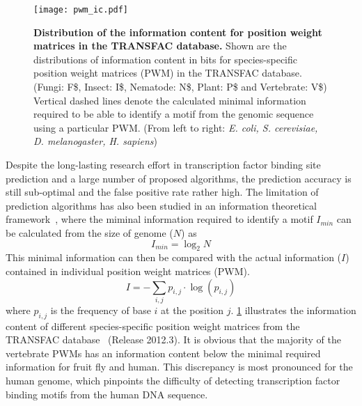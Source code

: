 \begin{figure}[!ht]
\begin{center}
\texttt{[image: pwm\_ic.pdf]}
\end{center}
\caption[Information content of position weight matrices]{
{\bf Distribution of the information content for position weight matrices in 
the TRANSFAC database.}
Shown are the distributions of information content in bits for species-specific
position weight matrices (PWM) in the TRANSFAC database. (Fungi: F\$, Insect: I\$,
Nematode: N\$, Plant: P\$ and Vertebrate: V\$) Vertical dashed lines denote
the calculated minimal information required to be able to identify a motif from
the genomic sequence using a particular PWM. (From left to right: \emph{E. coli, 
S. cerevisiae, D. melanogaster, H. sapiens})
}
\label{fig:pwm_ic}
\end{figure}

Despite the long-lasting research effort in transcription factor binding site
prediction and a large number of proposed algorithms, the prediction accuracy 
is still sub-optimal and the false positive rate rather high. The limitation of
prediction algorithms has also been studied in an information theoretical
framework~\citep{Wunderlich2009}, where the miminal information required to identify a motif $I_{min}$ can be calculated from the size of genome ($N$) as
\begin{equation}
I_{min}=\log_2 N
\end{equation}
This minimal information can then be compared with the actual information ($I$) 
contained in individual position weight matrices (PWM).
\begin{equation}
\displaystyle I = -\sum_{i,j}p_{i,j} \cdot \log(p_{i,j})
\end{equation}
where $p_{i,j}$ is the frequency of base $i$ at the position $j$. \ref{fig:pwm_ic}
illustrates the information content of different species-specific position 
weight matrices from the TRANSFAC database~\citep{Matys2003b} (Release 2012.3). 
It is obvious that
the majority of the vertebrate PWMs has an information content below the 
minimal required information for fruit fly and human. This discrepancy is most
pronounced for the human genome, which pinpoints the difficulty of detecting 
transcription factor binding motifs from the human DNA sequence.

